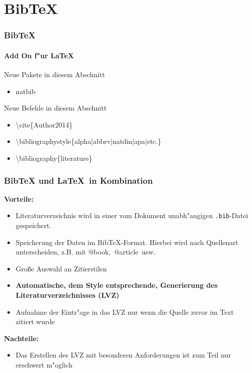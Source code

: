 \section{BibTeX}
\begin{frame}
\frametitle{BibTeX}
\framesubtitle{Add On f"ur \LaTeX}
\begin{exampleblock}{Neue Pakete in diesem Abschnitt}
\begin{itemize}
\item natbib
\end{itemize}
\end{exampleblock}

\begin{block}{Neue Befehle in diesem Abschnitt}
\begin{itemize}
\item \color{nounibaredI}\textbackslash cite\color{black}\{Author2014\}
\item \color{nounibaredI}\textbackslash bibliographystyle\color{black}\{alpha$\mid$abbrv$\mid$natdin$\mid$apa$\mid$etc.\}
\item \color{nounibaredI}\textbackslash bibliography\color{black}\{literature\}
\end{itemize}
\end{block}
\end{frame}


\begin{frame}
\frametitle{BibTeX und \LaTeX ~in Kombination}
\textbf{Vorteile:}
\begin{itemize}
\item Literaturverzeichnis wird in einer vom Dokument unabh"angigen \texttt{.bib}-Datei gespeichert.
\item Speicherung der Daten im BibTeX-Format. Hierbei wird nach Quellenart unterscheiden, z.B. mit \color{nounibaredI}$@$book\color{black},~\color{nounibaredI}$@$article\color{black}~usw.
\item Gro\ss e Auswahl an Zitierstilen
\item \textbf{Automatische, dem Style entsprechende, Generierung des Literaturverzeichnisses (LVZ)}
\item Aufnahme der Eintr"age in das LVZ nur wenn die Quelle zuvor im Text zitiert wurde
\end{itemize}
\textbf{Nachteile:}
\begin{itemize}
\item Das Erstellen des LVZ mit besonderen Anforderungen ist zum Teil nur erschwert m"oglich
\end{itemize}
\end{frame}

